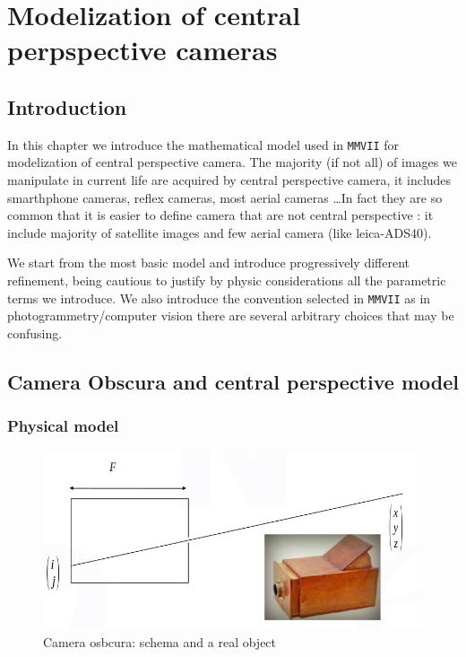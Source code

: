 \chapter{Modelization of central perpspective cameras}



\section{Introduction}

In this chapter we introduce the mathematical model used in {\tt MMVII}
for modelization of central perspective camera.  The majority (if not all)
of images we manipulate in current life are acquired by central perspective camera, it includes
smarthphone cameras,  reflex cameras,  most aerial cameras \dots  In fact they are so common that
it is easier to define camera that are not central  perspective :
it include majority of satellite images and few aerial camera (like leica-ADS40).

We start from the most basic model and introduce progressively different refinement,
being cautious to justify by physic considerations all the parametric terms we introduce.
We also introduce the convention selected in {\tt MMVII} as in photogrammetry/computer vision
there are several arbitrary choices that may be confusing.


\section{Camera Obscura and  central perspective model}

\subsection{Physical model}

\begin{figure}
\centering
\includegraphics[width=12cm]{Methods/Images/CameraObscura.jpg}\caption{Camera osbcura: schema and a real object}
	\label{fig:CameraObscura}
\end{figure}


